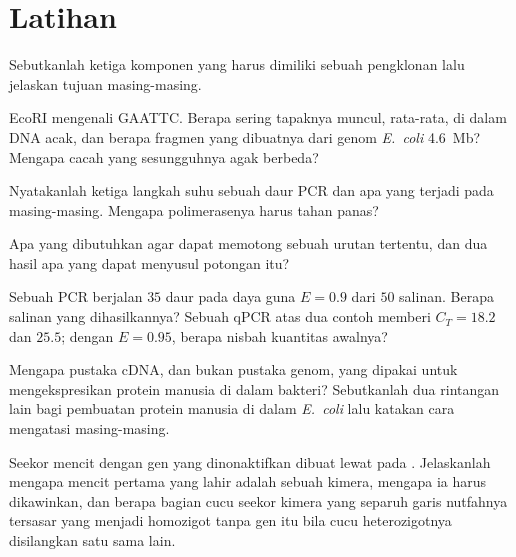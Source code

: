 \section{Latihan}

\begin{exercise}[$\star$]\label{exo:b3:genetic-engineering:1}
Sebutkanlah ketiga komponen yang harus dimiliki sebuah  pengklonan lalu
jelaskan tujuan masing-masing.
\end{exercise}

\begin{exercise}[$\star$]\label{exo:b3:genetic-engineering:2}
EcoRI mengenali GAATTC. Berapa sering tapaknya muncul, rata-rata, di dalam DNA
acak, dan berapa fragmen yang dibuatnya dari genom \emph{E.~coli} \qty{4.6}{Mb}?
Mengapa cacah yang sesungguhnya agak berbeda?
\end{exercise}

\begin{exercise}[$\star$]\label{exo:b3:genetic-engineering:3}
Nyatakanlah ketiga langkah suhu sebuah daur PCR dan apa yang terjadi pada
masing-masing. Mengapa polimerasenya harus tahan panas?
\end{exercise}

\begin{exercise}[$\star$]\label{exo:b3:genetic-engineering:4}
Apa yang dibutuhkan  agar dapat memotong sebuah urutan tertentu, dan dua
hasil apa yang dapat menyusul potongan itu?
\end{exercise}

\begin{exercise}[$\star\star$]\label{exo:b3:genetic-engineering:5}
Sebuah PCR berjalan $35$ daur pada daya guna $E = 0.9$ dari $50$ salinan.
Berapa salinan yang dihasilkannya? Sebuah qPCR atas dua contoh memberi
$C_{T} = 18.2$ dan $25.5$; dengan $E = 0.95$, berapa nisbah kuantitas awalnya?
\end{exercise}

\begin{exercise}[$\star\star$]\label{exo:b3:genetic-engineering:6}
Mengapa pustaka cDNA, dan bukan pustaka genom, yang dipakai untuk
mengekspresikan protein manusia di dalam bakteri? Sebutkanlah dua rintangan
lain bagi pembuatan protein manusia di dalam \emph{E.~coli} lalu katakan cara
mengatasi masing-masing.
\end{exercise}

\begin{exercise}[$\star\star$]\label{exo:b3:genetic-engineering:7}
Seekor mencit dengan gen yang dinonaktifkan dibuat lewat  pada
. Jelaskanlah mengapa mencit pertama yang lahir adalah sebuah
kimera, mengapa ia harus dikawinkan, dan berapa bagian cucu seekor kimera
yang separuh garis nutfahnya tersasar yang menjadi homozigot tanpa gen itu
bila cucu heterozigotnya disilangkan satu sama lain.
\end{exercise}

